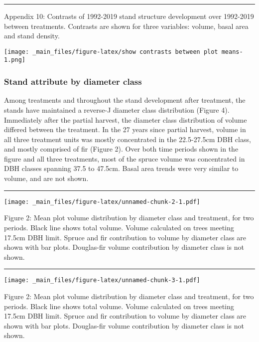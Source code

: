 \documentclass[
]{article}
\begin{document}
\begin{center}\rule{0.5\linewidth}{0.5pt}\end{center}

Appendix 10: Contrasts of 1992-2019 stand structure development over 1992-2019 between treatments. Contrasts are shown for three variables: volume, basal area and stand density.

\texttt{[image: \_main\_files/figure-latex/show contrasts between plot means-1.png]}

\hypertarget{stand-attribute-by-diameter-class}{%
\subsubsection{Stand attribute by diameter class}\label{stand-attribute-by-diameter-class}}

Among treatments and throughout the stand development after treatment, the stands have maintained a reverse-J diameter class distribution (Figure 4).\\
Immediately after the partial harvest, the diameter class distribution of volume differed between the treatment. In the 27 years since partial harvest, volume in all three treatment units was mostly concentrated in the 22.5-27.5cm DBH class, and mostly comprised of fir (Figure 2). Over both time periods shown in the figure and all three treatments, most of the spruce volume was concentrated in DBH classes spanning 37.5 to 47.5cm. Basal area trends were very similar to volume, and are not shown.

\begin{center}\rule{0.5\linewidth}{0.5pt}\end{center}

\texttt{[image: \_main\_files/figure-latex/unnamed-chunk-2-1.pdf]}

Figure 2: Mean plot volume distribution by diameter class and treatment, for two periods. Black line shows total volume. Volume calculated on trees meeting 17.5cm DBH limit. Spruce and fir contribution to volume by diameter class are shown with bar plots. Douglas-fir volume contribution by diameter class is not shown.

\begin{center}\rule{0.5\linewidth}{0.5pt}\end{center}

\texttt{[image: \_main\_files/figure-latex/unnamed-chunk-3-1.pdf]}

Figure 2: Mean plot volume distribution by diameter class and treatment, for two periods. Black line shows total volume. Volume calculated on trees meeting 17.5cm DBH limit. Spruce and fir contribution to volume by diameter class are shown with bar plots. Douglas-fir volume contribution by diameter class is not shown.
\end{document}
